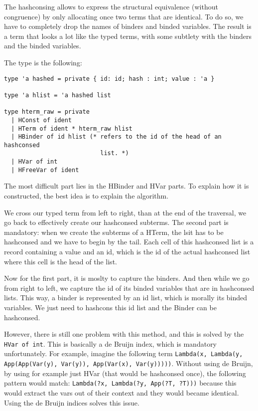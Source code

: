 The hashconsing allows to express the structural equivalence (without
congruence) by only allocating once two terms that are identical. To do so, we
have to completely drop the names of binders and binded variables. The result is
a term that looks a lot like the typed terms, with some subtlety with the
binders and the binded variables.

The type is the following:
\begin{verbatim}
type 'a hashed = private { id: id; hash : int; value : 'a }

type 'a hlist = 'a hashed list

type hterm_raw = private
  | HConst of ident
  | HTerm of ident * hterm_raw hlist
  | HBinder of id hlist (* refers to the id of the head of an hashconsed
                           list. *)
  | HVar of int
  | HFreeVar of ident
\end{verbatim}

The most difficult part lies in the HBinder and HVar parts. To explain how it is
constructed, the best idea is to explain the algorithm. 

We cross our typed term from left to right, than at the end of the traversal, we
go back to effectively create our hashconsed subterms. The second part is
mandatory: when we create the subterms of a HTerm, the lsit has to be hashconsed
and we have to begin by the tail. Each cell of this hashconsed list is a record
containing a value and an id, which is the id of the actual hashconsed list
where this cell is the head of the list.

Now for the first part, it is moslty to capture the binders. And then while we
go from right to left, we capture the id of its binded variables that are in
hashconsed lists. This way, a binder is represented by an id list, which is
morally its binded variables. We just need to hashcons this id list and the
Binder can be hashconsed.

However, there is still one problem with this method, and this is solved by the
\texttt{HVar of int}. This is basically a de Bruijn index, which is mandatory
unfortunately. For example, imagine the following term 
\texttt{Lambda(x, Lambda(y, App(App(Var(y), Var(y)), App(Var(x), Var(y)))))}.
Without using de Bruijn, by using for example just HVar (that would be
hashconsed once), the following pattern would match: 
\texttt{Lambda(?x, Lambda(?y, App(?T, ?T)))} because this would extract the vars
out of their context and they would became identical. Using the de Bruijn
indices solves this issue.

